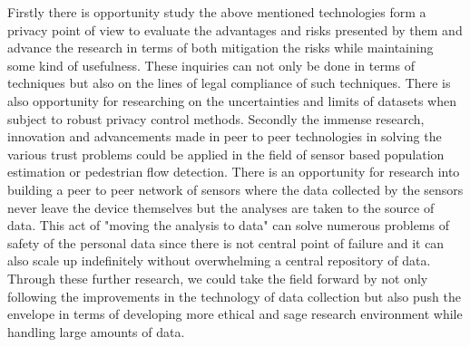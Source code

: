 Firstly there is opportunity study the above mentioned technologies form a privacy point of view to evaluate the advantages and risks presented by them and advance the research in terms of both mitigation the risks while maintaining some kind of usefulness.
These inquiries can not only be done in terms of techniques but also on the lines of legal compliance of such techniques. 
There is also opportunity for researching on the uncertainties and limits of datasets when subject to robust privacy control methods.
Secondly the immense research, innovation and advancements made in peer to peer technologies in solving the various trust problems could be applied in the field of sensor based population estimation or pedestrian flow detection.
There is an opportunity for research into building a peer to peer network of sensors where the data collected by the sensors never leave the device themselves but the analyses are taken to the source of data. 
This act of "moving the analysis to data" can solve numerous problems of safety of the personal data since there is not central point of failure and it can also scale up indefinitely without overwhelming a central repository of data.
Through these further research, we could take the field forward by not only following the improvements in the technology of data collection but also push the envelope in terms of developing more ethical and sage research environment while handling large amounts of data.
